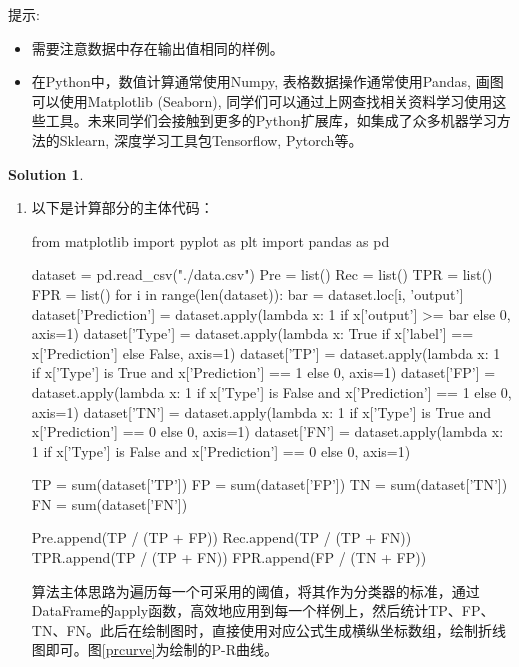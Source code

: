 \documentclass[a4paper,UTF8]{article}
\theoremstyle{definition}
\newtheorem*{solution}{Solution}
\begin{document}
提示:
\begin{itemize}
	\item 需要注意数据中存在输出值相同的样例。
	\item 
	在Python中，数值计算通常使用Numpy, 表格数据操作通常使用Pandas, 画图可以使用Matplotlib (Seaborn), 同学们可以通过上网查找相关资料学习使用这些工具。未来同学们会接触到更多的Python扩展库，如集成了众多机器学习方法的Sklearn, 深度学习工具包Tensorflow, Pytorch等。
\end{itemize}
\begin{solution}
	\phantom{abc}
\begin{enumerate}[ {(}1{)}]
	\item 以下是计算部分的主体代码：
	\begin{python}
from matplotlib import pyplot as plt
import pandas as pd

dataset = pd.read_csv("./data.csv")
Pre = list()
Rec = list()
TPR = list()
FPR = list()
for i in range(len(dataset)):
	bar = dataset.loc[i, 'output']
	dataset['Prediction'] = dataset.apply(lambda x: 1 if x['output'] >= bar else 0, axis=1)
	dataset['Type'] = dataset.apply(lambda x: True if x['label'] == x['Prediction'] else False, axis=1)
	dataset['TP'] = dataset.apply(lambda x: 1 if x['Type'] is True and x['Prediction'] == 1 else 0, axis=1)
	dataset['FP'] = dataset.apply(lambda x: 1 if x['Type'] is False and x['Prediction'] == 1 else 0, axis=1)
	dataset['TN'] = dataset.apply(lambda x: 1 if x['Type'] is True and x['Prediction'] == 0 else 0, axis=1)
	dataset['FN'] = dataset.apply(lambda x: 1 if x['Type'] is False and x['Prediction'] == 0 else 0, axis=1)

	TP = sum(dataset['TP'])
	FP = sum(dataset['FP'])
	TN = sum(dataset['TN'])
	FN = sum(dataset['FN'])

Pre.append(TP / (TP + FP))
Rec.append(TP / (TP + FN))
TPR.append(TP / (TP + FN))
FPR.append(FP / (TN + FP))
	\end{python}
算法主体思路为遍历每一个可采用的阈值，将其作为分类器的标准，通过DataFrame的apply函数，高效地应用到每一个样例上，然后统计TP、FP、TN、FN。此后在绘制图时，直接使用对应公式生成横纵坐标数组，绘制折线图即可。图\ref{prcurve}为绘制的P-R曲线。
\begin{figure}[H]
	
	\centering
	

\end{figure}
\end{enumerate}
\end{solution}
\end{document}

